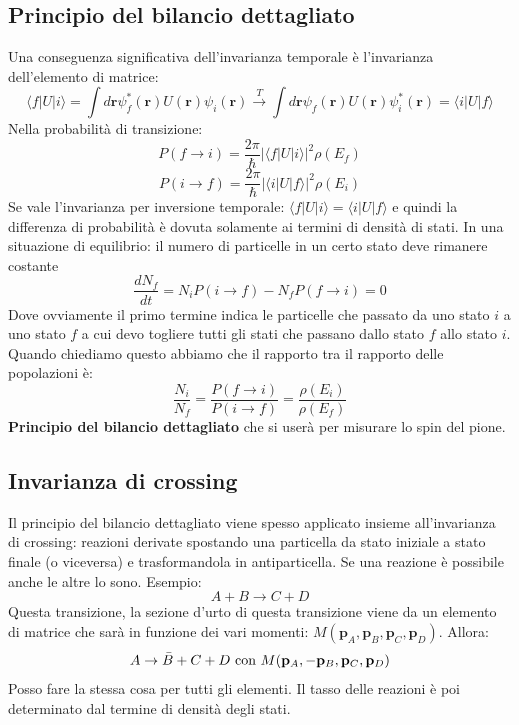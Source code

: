 \subsection{Principio del bilancio dettagliato}
Una conseguenza significativa dell'invarianza temporale è l'invarianza dell'elemento di matrice:
\begin{equation*}
    \langle f|U|i\rangle=\int d\mathbf{r}\psi_f^*(\mathbf{r})U(\mathbf{r})\psi_i(\mathbf{r})\xrightarrow[]{T}\int d\mathbf{r}\psi_f(\mathbf{r})U(\mathbf{r})\psi_i^*(\mathbf{r})= \langle i|U|f\rangle
\end{equation*}
Nella probabilità di transizione:
\begin{equation*}
    P(f\to i)=\frac{2\pi}{\hbar}|\langle f|U|i\rangle|^2\rho(E_f)
\end{equation*}
\begin{equation*}
    P(i\to f)=\frac{2\pi}{\hbar}|\langle i|U|f\rangle|^2\rho(E_i)
\end{equation*}
Se vale l'invarianza per inversione temporale: $\langle f|U|i\rangle=\langle i|U|f\rangle$ e quindi la differenza di probabilità è dovuta solamente ai termini di densità di stati. In una situazione di equilibrio: il numero di particelle in un certo stato deve rimanere costante
\begin{equation*}
    \frac{dN_f}{dt}=N_iP(i\to f)-N_fP(f\to i)=0
\end{equation*}
Dove ovviamente il primo termine indica le particelle che passato da uno stato $i$ a uno stato $f$ a cui devo togliere tutti gli stati che passano dallo stato $f$ allo stato $i$. Quando chiediamo questo abbiamo che il rapporto tra il rapporto delle popolazioni è:
\begin{equation*}
    \frac{N_i}{N_f}=\frac{P(f\to i)}{P(i\to f)}=\frac{\rho(E_i)}{\rho(E_f)}
\end{equation*}
\textbf{Principio del bilancio dettagliato} che si userà per misurare lo spin del pione.
\subsection{Invarianza di crossing}
Il principio del bilancio dettagliato viene spesso applicato insieme all'invarianza di crossing: reazioni derivate spostando una particella da stato iniziale a stato finale (o viceversa) e trasformandola in antiparticella. Se una reazione è possibile anche le altre lo sono. Esempio:
\begin{equation*}
    A+B\to C+D
\end{equation*}
Questa transizione, la sezione d'urto di questa transizione viene da un elemento di matrice che sarà in funzione dei vari momenti: $M(\mathbf{p}_A,\mathbf{p}_B,\mathbf{p}_C,\mathbf{p}_D)$. Allora:
\begin{equation*}
    A\to\Bar{B}+C+D \text{ con } M(\mathbf{p}_A,-\mathbf{p}_B,\mathbf{p}_C,\mathbf{p}_D)
\end{equation*}
Posso fare la stessa cosa per tutti gli elementi. Il tasso delle reazioni è poi determinato dal termine di densità degli stati. 
